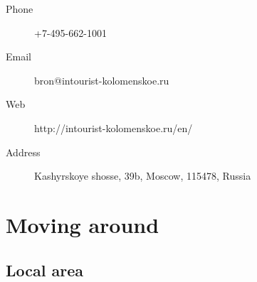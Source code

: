 \documentclass[10pt,fleqn,openany]{book} %
\begin{document}
\par\bigskip
\par\bigskip
\begin{description}
	\item[Phone] +7-495-662-1001
	\item[Email] bron@intourist-kolomenskoe.ru
	\item[Web] http://intourist-kolomenskoe.ru/en/
	\item[Address] Kashyrskoye shosse, 39b, Moscow, 115478, Russia
\end{description}



\chapter{Moving around}

\section{Local area}
\end{document}
